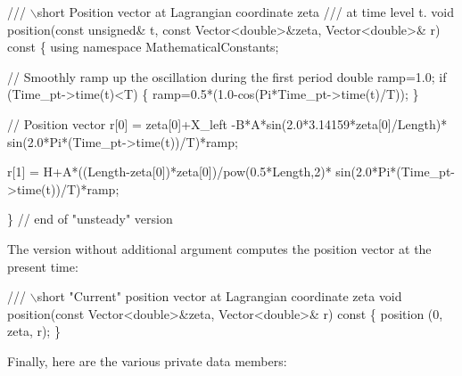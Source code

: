 \begin{DoxyCodeInclude}
\textcolor{comment}{}
\textcolor{comment}{ /// \(\backslash\)short Position vector at Lagrangian coordinate zeta }
\textcolor{comment}{ /// at time level t.}
\textcolor{comment}{} \textcolor{keywordtype}{void} position(\textcolor{keyword}{const} \textcolor{keywordtype}{unsigned}& t, \textcolor{keyword}{const} Vector<double>&zeta, 
               Vector<double>& r)\textcolor{keyword}{ const}
\textcolor{keyword}{  }\{
   \textcolor{keyword}{using namespace }MathematicalConstants;

   \textcolor{comment}{// Smoothly ramp up the oscillation during the first period}
   \textcolor{keywordtype}{double} ramp=1.0;
   \textcolor{keywordflow}{if} (Time\_pt->time(t)<T)
    \{
     ramp=0.5*(1.0-cos(Pi*Time\_pt->time(t)/T));
    \}
   
   \textcolor{comment}{// Position vector}
   r[0] = zeta[0]+X\_left 
    -B*A*sin(2.0*3.14159*zeta[0]/Length)*
    sin(2.0*Pi*(Time\_pt->time(t))/T)*ramp;

   r[1] = H+A*((Length-zeta[0])*zeta[0])/pow(0.5*Length,2)*
    sin(2.0*Pi*(Time\_pt->time(t))/T)*ramp;

  \} \textcolor{comment}{// end of "unsteady" version}

\end{DoxyCodeInclude}


The version without additional argument computes the position vector at the present time\+:


\begin{DoxyCodeInclude}

\textcolor{comment}{}
\textcolor{comment}{ /// \(\backslash\)short "Current" position vector at Lagrangian coordinate zeta }
\textcolor{comment}{} \textcolor{keywordtype}{void} position(\textcolor{keyword}{const} Vector<double>&zeta, Vector<double>& r)\textcolor{keyword}{ const}
\textcolor{keyword}{  }\{
   position (0, zeta, r);
  \}

\end{DoxyCodeInclude}


Finally, here are the various private data members\+:


